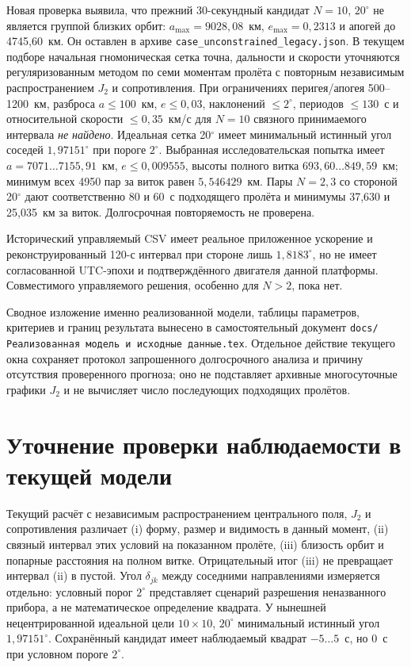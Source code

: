 \documentclass[a4paper,12pt]{article}
\begin{document}
Новая проверка выявила, что прежний 30-секундный кандидат
$N=10$, $20^\circ$ не является группой близких орбит:
$a_{\max}=9028{,}08$~км, $e_{\max}=0{,}2313$ и апогей
до 4745{,}60~км. Он оставлен в архиве
\texttt{case\_unconstrained\_legacy.json}. В текущем подборе
начальная гномоническая сетка точна, дальности и скорости
уточняются регуляризованным методом по семи моментам пролёта
с повторным независимым распространением $J_2$ и сопротивления.
При ограничениях перигея/апогея 500--1200~км, разброса
$a\leq100$~км, $e\leq0{,}03$, наклонений $\leq2^\circ$,
периодов $\leq130$~с и относительной скорости
$\leq0{,}35$~км/с для $N=10$ связного принимаемого
интервала \emph{не найдено}. Идеальная сетка 20$^\circ$
имеет минимальный истинный угол соседей $1{,}97151^\circ$
при пороге $2^\circ$. Выбранная исследовательская попытка
имеет $a=7071\ldots7155{,}91$~км, $e\leq0{,}009555$,
высоты полного витка $693{,}60\ldots849{,}59$~км;
минимум всех 4950 пар за виток равен $5{,}546429$~км.
Пары $N=2,3$ со стороной 20$^\circ$ дают соответственно
80 и 60~с подходящего пролёта и минимумы 37{,}630 и
25{,}035~км за виток. Долгосрочная повторяемость не
проверена.

Исторический управляемый CSV имеет реальное приложенное
ускорение и реконструированный 120-с интервал при стороне лишь
$1{,}8183^\circ$, но не имеет согласованной UTC-эпохи и
подтверждённого двигателя данной платформы. Совместимого
управляемого решения, особенно для $N>2$, пока нет.

Сводное изложение именно реализованной модели, таблицы параметров,
критериев и границ результата вынесено в самостоятельный документ
\texttt{docs/Реализованная модель и исходные данные.tex}.
Отдельное действие текущего окна сохраняет протокол запрошенного
долгосрочного анализа и причину отсутствия проверенного прогноза;
оно не подставляет архивные многосуточные графики $J_2$ и не
вычисляет число последующих подходящих пролётов.

\section{Уточнение проверки наблюдаемости в текущей модели}

Текущий расчёт с независимым распространением центрального поля,
$J_2$ и сопротивления различает (i) форму, размер и видимость
в данный момент, (ii) связный интервал этих условий на показанном
пролёте, (iii) близость орбит и попарные расстояния на полном витке.
Отрицательный итог (iii) не превращает интервал (ii) в пустой.
Угол $\delta_{jk}$ между соседними направлениями измеряется отдельно:
условный порог $2^\circ$ представляет сценарий разрешения
неназванного прибора, а не математическое определение квадрата.
У нынешней нецентрированной идеальной цели $10\times10$,
$20^\circ$ минимальный истинный угол $1{,}97151^\circ$.
Сохранённый кандидат имеет наблюдаемый квадрат $-5\ldots5$~с,
но $0$~с при условном пороге $2^\circ$.
\end{document}
